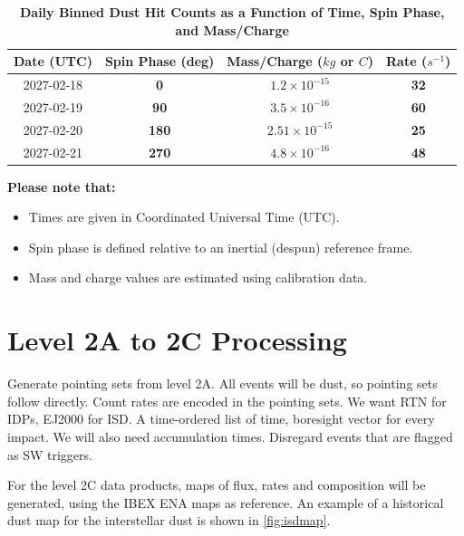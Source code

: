 \begin{table}[h]
    \centering
    \caption{\textbf{Daily Binned Dust Hit Counts as a Function of Time, Spin Phase, and Mass/Charge}}
    \label{tab:dust_counts}
    \renewcommand{\arraystretch}{1.3}
    \setlength{\arrayrulewidth}{1.2pt}
    \begin{tabular}{c c c c}
        \hline\hline
        \textbf{Date (UTC)} & \textbf{Spin Phase (deg)} & \textbf{Mass/Charge ($\si{kg}$ or $\si{C}$)} & \textbf{Rate ($s^{-1}$)} \\
        \hline\hline
        2027-02-18 & \textbf{0}  & \textbf{$1.2 \times 10^{-15}$}  & \textbf{32}  \\
        2027-02-19 & \textbf{90} & \textbf{$3.5 \times 10^{-16}$}  & \textbf{60} \\
        2027-02-20 & \textbf{180} & \textbf{$2.51 \times 10^{-15}$}  & \textbf{25}  \\
        2027-02-21 & \textbf{270} & \textbf{$4.8 \times 10^{-16}$}  & \textbf{48} \\
        \hline\hline
    \end{tabular}
\end{table}

\textbf{Please note that: }
\begin{itemize}
    \item Times are given in Coordinated Universal Time (UTC).
    \item Spin phase is defined relative to an inertial (despun) reference frame.
    \item Mass and charge values are estimated using calibration data.
\end{itemize}

\section{Level 2A to 2C Processing}

Generate pointing sets from level 2A. All events will be dust, so pointing sets follow directly. Count rates are encoded in the pointing sets. We want RTN for IDPs, EJ2000 for ISD. A time-ordered list of time, boresight vector for every impact. We will also need accumulation times. Disregard events that are flagged as SW triggers.

For the level 2C data products, maps of flux, rates and composition will be generated, using the IBEX ENA maps as reference. An example of a historical dust map for the interstellar dust is shown in \autoref{fig:isdmap}.


